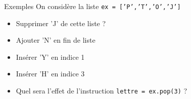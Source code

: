 \documentclass[10pt]{beamer}
\begin{document}
\begin{frame}
	\mframe{\Python}
	\begin{exampleblock}{Exemples}
		On considère la liste {\tt ex = ['P','T','O','J']}
		\begin{itemize}
			\item<4-> Supprimer 'J' de cette liste ?
			\item<5-> Ajouter 'N' en fin de liste
			\item<6-> Insérer 'Y' en indice 1
			\item<7-> Insérer 'H' en indice 3
			\item<8-> Quel sera l'effet de l'instruction {\tt lettre = ex.pop(3)} ?
		\end{itemize}
	\end{exampleblock}
\end{frame}
\end{document}
